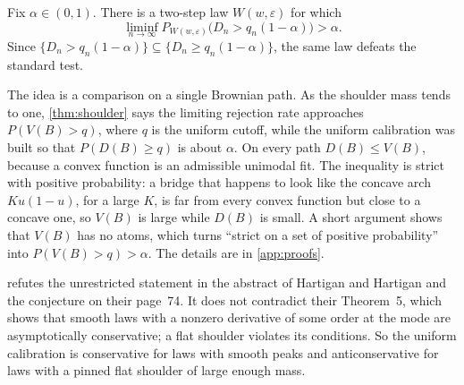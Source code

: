 \begin{theorem}\label{thm:fail}
Fix $\alpha\in(0,1)$. There is a two-step law $W(w,\varepsilon)$ for which
\[
\liminf_{n\to\infty}P_{W(w,\varepsilon)}\bigl(D_n>q_n(1-\alpha)\bigr)>\alpha .
\]
Since $\{D_n>q_n(1-\alpha)\}\subseteq\{D_n\ge q_n(1-\alpha)\}$, the same law defeats the standard test.
\end{theorem}

The idea is a comparison on a single Brownian path. As the shoulder mass tends to one, \cref{thm:shoulder} says the limiting rejection rate approaches $P(V(B)>q)$, where $q$ is the uniform cutoff, while the uniform calibration was built so that $P(D(B)\ge q)$ is about $\alpha$. On every path $D(B)\le V(B)$, because a convex function is an admissible unimodal fit. The inequality is strict with positive probability: a bridge that happens to look like the concave arch $Ku(1-u)$, for a large $K$, is far from every convex function but close to a concave one, so $V(B)$ is large while $D(B)$ is small. A short argument shows that $V(B)$ has no atoms, which turns ``strict on a set of positive probability'' into $P(V(B)>q)>\alpha$. The details are in \cref{app:proofs}.

 refutes the unrestricted statement in the abstract of Hartigan and Hartigan and the conjecture on their page~74. It does not contradict their Theorem~5, which shows that smooth laws with a nonzero derivative of some order at the mode are asymptotically conservative; a flat shoulder violates its conditions. So the uniform calibration is conservative for laws with smooth peaks and anticonservative for laws with a pinned flat shoulder of large enough mass.
